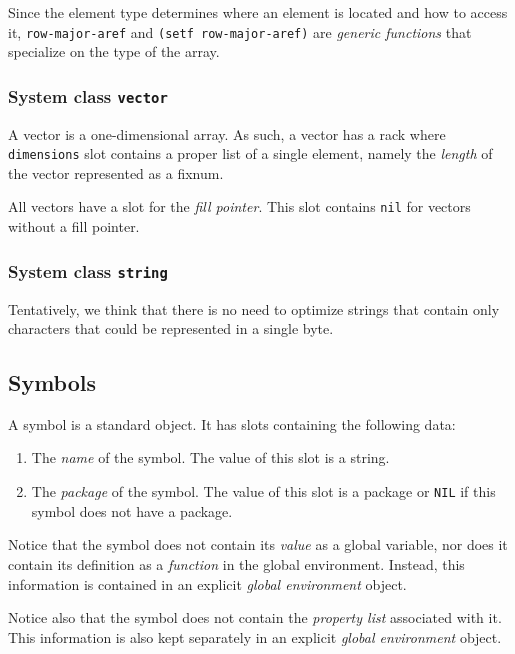 Since the element type determines where an element is located and how
to access it, \texttt{row-major-aref} and \texttt{(setf
  row-major-aref)} are \emph{generic functions} that specialize on the
type of the array.

\subsubsection{System class \texttt{vector}}

A vector is a one-dimensional array.  As such, a vector has a rack
where \texttt{dimensions} slot contains a proper list of a single
element, namely the \emph{length} of the vector represented as a
fixnum.

All vectors have a slot for the \emph{fill pointer}.  This slot
contains \texttt{nil} for vectors without a fill pointer.

\subsubsection{System class \texttt{string}}

Tentatively, we think that there is no need to optimize strings that
contain only characters that could be represented in a single byte.

\subsection{Symbols}

A symbol is a standard object.  It has slots containing the following
data:

\begin{enumerate}
\item The \emph{name} of the symbol.  The value of this slot is a
  string.
\item The \emph{package} of the symbol.  The value of this slot is a
  package or \texttt{NIL} if this symbol does not have a package.
\end{enumerate}

Notice that the symbol does not contain its \emph{value} as a global
variable, nor does it contain its definition as a \emph{function} in
the global environment.  Instead, this information is contained in an
explicit \emph{global environment} object.

Notice also that the symbol does not contain the \emph{property list}
associated with it.  This information is also kept separately in an
explicit \emph{global environment} object.

